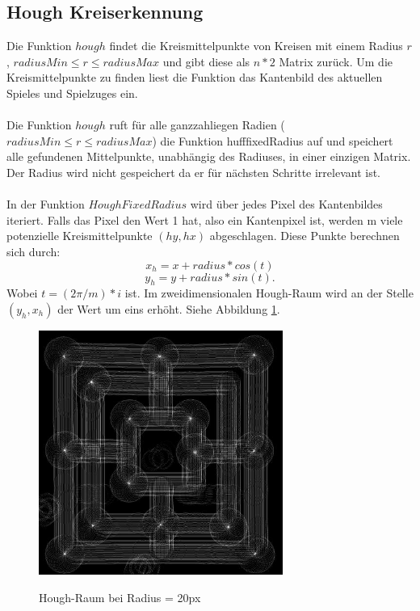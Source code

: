 \documentclass[paper=A4, deutsch]{scrartcl}
\begin{document}
\subsection{Hough Kreiserkennung}
Die Funktion \(hough\) findet die Kreismittelpunkte von Kreisen mit einem Radius \(r\), \(radiusMin \leq r \leq radiusMax \)  und gibt diese als \(n * 2\) Matrix zurück. 
Um die Kreismittelpunkte zu finden liest die Funktion das Kantenbild des aktuellen Spieles und Spielzuges ein. \\
\\
Die Funktion \(hough\) ruft für alle ganzzahliegen Radien (\(radiusMin \leq r \leq radiusMax\)) die Funktion hufffixedRadius auf und speichert alle gefundenen Mittelpunkte, unabhängig des Radiuses, in einer einzigen Matrix. Der Radius wird nicht gespeichert da er für nächsten Schritte irrelevant ist.\\
\\
In der Funktion \(HoughFixedRadius\) wird über jedes Pixel des Kantenbildes iteriert. Falls das Pixel den Wert 1 hat, also ein Kantenpixel ist, werden m  viele potenzielle Kreismittelpunkte \((hy, hx)\)  abgeschlagen. Diese Punkte berechnen sich durch:  
\begin{equation}
x_{h} = x + radius * cos(t)
\end{equation}
\begin{equation}
y_{h} = y + radius *  sin(t).
\end{equation}
Wobei \(t = (2\pi/m)*i\) ist. 
Im zweidimensionalen Hough-Raum wird an der Stelle \((y_{h}, x_{h})\) der Wert um eins erhöht. Siehe Abbildung \ref{fig:houghfixed}.\\

\begin{figure}[ht]
	\centering
		\includegraphics[width=8cm]{Huffexample3_16.jpg}\\
	\caption[Hough-Raum bei Radius = 20px]{Hough-Raum bei Radius = 20px}
	\label{fig:houghfixed}
\end{figure}
\end{document}
